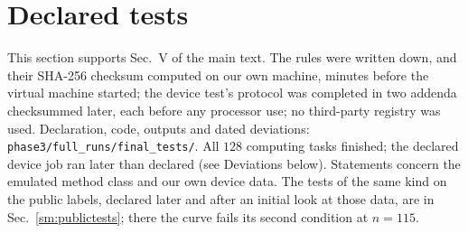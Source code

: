 \documentclass[aps,prx,onecolumn,10pt,nofootinbib,longbibliography,floatfix]{revtex4-2}
\theoremstyle{remark}
\begin{document}
\section{Declared tests}
\label{sec:declared}

This section supports Sec.~V of the main text. The rules were written down, and their SHA-256 checksum computed on our own machine, minutes before the virtual %
machine started; the device test's protocol was completed in two addenda checksummed later, each before any processor
use; no third-party registry was used. Declaration, code, outputs and dated deviations: \texttt{phase3/full\_runs/final\_tests/}. All $128$ %
computing tasks finished; the declared device job ran later than declared (see Deviations below). Statements concern the emulated method class and our own device data. The tests of
the same kind on the public labels, declared later and after an initial look at those data, are in
Sec.~\ref{sm:publictests}; there the curve fails its second condition at $n=115$.
\end{document}
